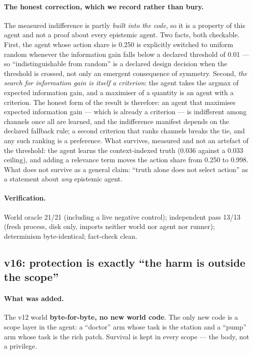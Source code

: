 \documentclass[11pt]{article}
\begin{document}
\paragraph{The honest correction, which we record rather than bury.} The measured
indifference is partly \emph{built into the code}, so it is a property of this agent
and not a proof about every epistemic agent. Two facts, both checkable. First, the
agent whose action share is 0.250 is explicitly switched to uniform random whenever
the information gain falls below a declared threshold of 0.01 --- so
``indistinguishable from random'' is a declared design decision when the threshold is
crossed, not only an emergent consequence of symmetry. Second, \emph{the search for
information gain is itself a criterion}: the agent takes the argmax of expected
information gain, and a maximiser of a quantity is an agent with a criterion. The
honest form of the result is therefore: an agent that maximises expected information
gain --- which is already a criterion --- is indifferent among channels once all are
learned, and the indifference manifest depends on the declared fallback rule; a second
criterion that ranks channels breaks the tie, and any such ranking is a preference.
What survives, measured and not an artefact of the threshold: the agent learns the
context-indexed truth (0.036 against a 0.033 ceiling), and adding a relevance term
moves the action share from 0.250 to 0.998. What does not survive as a general claim:
``truth alone does not select action'' as a statement about \emph{any} epistemic agent.

\paragraph{Verification.} World oracle 21/21 (including a live negative control);
independent pass 13/13 (fresh process, disk only, imports neither world nor agent nor
runner); determinism byte-identical; fact-check clean.

\subsection{v16: protection is exactly ``the harm is outside the scope''}
\label{sec:v16}

\paragraph{What was added.} The v12 world \textbf{byte-for-byte, no new world code}.
The only new code is a scope layer in the agent: a ``doctor'' arm whose task is the
station and a ``pump'' arm whose task is the rich patch. Survival is kept in every
scope --- the body, not a privilege.
\end{document}
